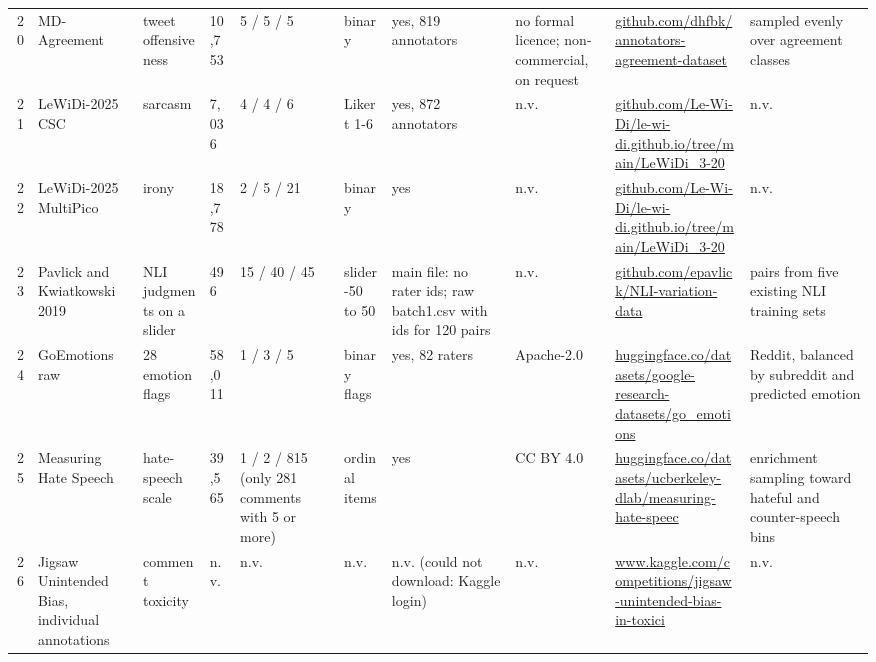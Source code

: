 \documentclass[10pt]{article}
\begin{document}
\begin{longtable}{@{}r p{1.15in} p{1.0in} p{0.75in} p{0.8in} p{0.8in} p{0.9in} p{0.8in} p{1.2in} p{1.5in}@{}}
20 & MD-Agreement & tweet offensiveness & 10,753 & 5 / 5 / 5 & binary & yes, 819 annotators & no formal licence; non-commercial, on request & \href{https://github.com/dhfbk/annotators-agreement-dataset}{github.com/\allowbreak{}dhfbk/\allowbreak{}annotators-\allowbreak{}agreement-\allowbreak{}dataset} & sampled evenly over agreement classes \\
21 & LeWiDi-2025 CSC & sarcasm & 7,036 & 4 / 4 / 6 & Likert 1-6 & yes, 872 annotators & n.v. & \href{https://github.com/Le-Wi-Di/le-wi-di.github.io/tree/main/LeWiDi_3-2025/CSC}{github.com/\allowbreak{}Le-\allowbreak{}Wi-\allowbreak{}Di/\allowbreak{}le-\allowbreak{}wi-\allowbreak{}di.github.io/\allowbreak{}tree/\allowbreak{}main/\allowbreak{}LeWiDi\_3-\allowbreak{}20} & n.v. \\
22 & LeWiDi-2025 MultiPico & irony & 18,778 & 2 / 5 / 21 & binary & yes & n.v. & \href{https://github.com/Le-Wi-Di/le-wi-di.github.io/tree/main/LeWiDi_3-2025/MP}{github.com/\allowbreak{}Le-\allowbreak{}Wi-\allowbreak{}Di/\allowbreak{}le-\allowbreak{}wi-\allowbreak{}di.github.io/\allowbreak{}tree/\allowbreak{}main/\allowbreak{}LeWiDi\_3-\allowbreak{}20} & n.v. \\
23 & Pavlick and Kwiatkowski 2019 & NLI judgments on a slider & 496 & 15 / 40 / 45 & slider -50 to 50 & main file: no rater ids; raw batch1.csv with ids for 120 pairs & n.v. & \href{https://github.com/epavlick/NLI-variation-data}{github.com/\allowbreak{}epavlick/\allowbreak{}NLI-\allowbreak{}variation-\allowbreak{}data} & pairs from five existing NLI training sets \\
24 & GoEmotions raw & 28 emotion flags & 58,011 & 1 / 3 / 5 & binary flags & yes, 82 raters & Apache-2.0 & \href{https://huggingface.co/datasets/google-research-datasets/go_emotions}{huggingface.co/\allowbreak{}datasets/\allowbreak{}google-\allowbreak{}research-\allowbreak{}datasets/\allowbreak{}go\_emotions} & Reddit, balanced by subreddit and predicted emotion \\
25 & Measuring Hate Speech & hate-speech scale & 39,565 & 1 / 2 / 815 (only 281 comments with 5 or more) & ordinal items & yes & CC BY 4.0 & \href{https://huggingface.co/datasets/ucberkeley-dlab/measuring-hate-speech}{huggingface.co/\allowbreak{}datasets/\allowbreak{}ucberkeley-\allowbreak{}dlab/\allowbreak{}measuring-\allowbreak{}hate-\allowbreak{}speec} & enrichment sampling toward hateful and counter-speech bins \\
26 & Jigsaw Unintended Bias, individual annotations & comment toxicity & n.v. & n.v. & n.v. & n.v. (could not download: Kaggle login) & n.v. & \href{https://www.kaggle.com/competitions/jigsaw-unintended-bias-in-toxicity-classification/data}{www.kaggle.com/\allowbreak{}competitions/\allowbreak{}jigsaw-\allowbreak{}unintended-\allowbreak{}bias-\allowbreak{}in-\allowbreak{}toxici} & n.v. \\
\bottomrule\end{longtable}
\clearpage\restoregeometry\pdfpagewidth=8.5in\pdfpageheight=11in
\end{document}
